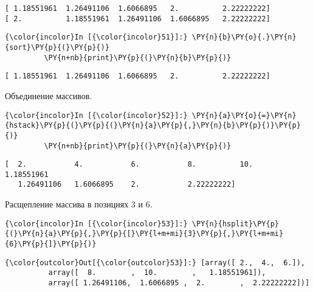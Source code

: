     \begin{Verbatim}[commandchars=\\\{\}]
[ 1.18551961  1.26491106  1.6066895   2.          2.22222222]
[ 2.          1.18551961  1.26491106  1.6066895   2.22222222]

    \end{Verbatim}

    \begin{Verbatim}[commandchars=\\\{\}]
{\color{incolor}In [{\color{incolor}51}]:} \PY{n}{b}\PY{o}{.}\PY{n}{sort}\PY{p}{(}\PY{p}{)}
         \PY{n+nb}{print}\PY{p}{(}\PY{n}{b}\PY{p}{)}
\end{Verbatim}

    \begin{Verbatim}[commandchars=\\\{\}]
[ 1.18551961  1.26491106  1.6066895   2.          2.22222222]

    \end{Verbatim}

    Объединение массивов.

    \begin{Verbatim}[commandchars=\\\{\}]
{\color{incolor}In [{\color{incolor}52}]:} \PY{n}{a}\PY{o}{=}\PY{n}{hstack}\PY{p}{(}\PY{p}{(}\PY{n}{a}\PY{p}{,}\PY{n}{b}\PY{p}{)}\PY{p}{)}
         \PY{n+nb}{print}\PY{p}{(}\PY{n}{a}\PY{p}{)}
\end{Verbatim}

    \begin{Verbatim}[commandchars=\\\{\}]
[  2.           4.           6.           8.          10.           1.18551961
   1.26491106   1.6066895    2.           2.22222222]

    \end{Verbatim}

    Расщепление массива в позициях 3 и 6.

    \begin{Verbatim}[commandchars=\\\{\}]
{\color{incolor}In [{\color{incolor}53}]:} \PY{n}{hsplit}\PY{p}{(}\PY{n}{a}\PY{p}{,}\PY{p}{[}\PY{l+m+mi}{3}\PY{p}{,}\PY{l+m+mi}{6}\PY{p}{]}\PY{p}{)}
\end{Verbatim}

            \begin{Verbatim}[commandchars=\\\{\}]
{\color{outcolor}Out[{\color{outcolor}53}]:} [array([ 2.,  4.,  6.]),
          array([  8.        ,  10.        ,   1.18551961]),
          array([ 1.26491106,  1.6066895 ,  2.        ,  2.22222222])]
\end{Verbatim}
        

